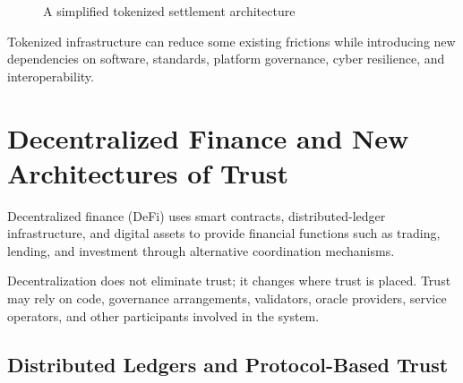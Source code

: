 \begin{figure}[H]
\centering
{}
\caption{A simplified tokenized settlement architecture}
\label{fig}
\end{figure}

Tokenized infrastructure can reduce some existing frictions while introducing new dependencies on software, standards, platform governance, cyber resilience, and interoperability.










\section{Decentralized Finance and New Architectures of Trust}


Decentralized finance (DeFi) uses smart contracts, distributed-ledger infrastructure, and digital assets to provide financial functions such as trading, lending, and investment through alternative coordination mechanisms.

Decentralization does not eliminate trust; it changes where trust is placed. Trust may rely on code, governance arrangements, validators, oracle providers, service operators, and other participants involved in the system.


\subsection{Distributed Ledgers and Protocol-Based Trust}

